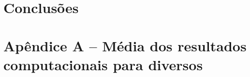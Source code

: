 \documentclass[12pt]{article}
\begin{document}
\section{Conclusões}

% 




\clearpage 
\appendix

\section*{Apêndice A -- Média dos resultados computacionais para diversos
\protect{$\alpha$}}

\tiny

\normalsize
\end{document}
